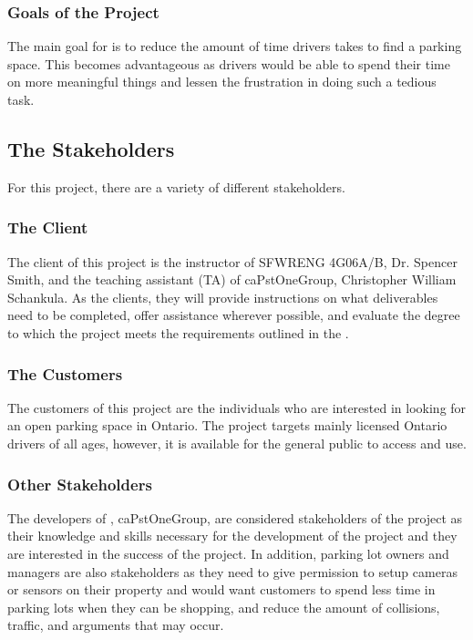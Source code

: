 \documentclass[12pt,letterpaper]{article}
\newcommand{\term}[2][]{\ifthenelse{\equal{#1}{}}{\hyperref[Term:#2]{\textbf{#2}}}{\hyperref[Term:#1]{\textbf{#2}}}}
\begin{document}
\subsubsection{Goals of the Project}
The main goal for \progname \space is to reduce the amount of time drivers takes to find a parking space. This becomes advantageous as drivers would be able to spend their time on more meaningful things and lessen the frustration in doing such a tedious task.

\subsection{The Stakeholders}
For this project, there are a variety of different stakeholders. 

\subsubsection{The Client}
The client of this project is the instructor of SFWRENG 4G06A/B, Dr. Spencer Smith, and the teaching assistant (TA) of caPstOneGroup, Christopher William Schankula. As the clients, they will provide instructions on what deliverables need to be completed, offer assistance wherever possible, and evaluate the degree to which the project meets the requirements outlined in the \term{SRS}.

\subsubsection{The Customers}
The customers of this project are the individuals who are interested in looking for an open parking space in Ontario. The project targets mainly licensed Ontario drivers of all ages, however, it is available for the general public to access and use.

\subsubsection{Other Stakeholders}
The developers of \progname, caPstOneGroup, are considered stakeholders of the project as their knowledge and skills necessary for the development of the project and they are interested in the success of the project. In addition, parking lot owners and managers are also stakeholders as they need to give permission to setup cameras or sensors on their property and would want customers to spend less time in parking lots when they can be shopping, and reduce the amount of collisions, traffic, and arguments that may occur.
\end{document}
